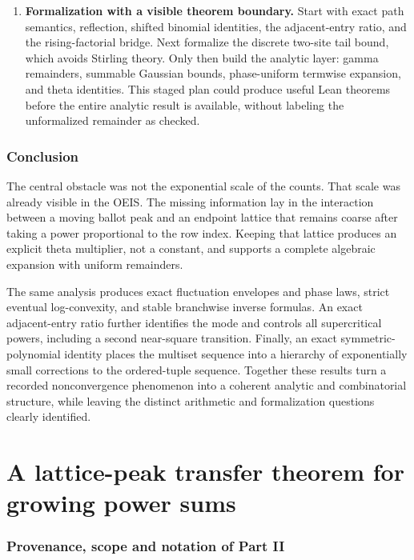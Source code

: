 \documentclass[11pt,a4paper]{article}
\numberwithin{equation}{section}
\theoremstyle{definition}
\begin{document}
\begin{enumerate}[leftmargin=*,label=\textbf{Q\arabic*.}]
\item \textbf{Formalization with a visible theorem boundary.}
Start with exact path semantics, reflection, shifted binomial identities,
the adjacent-entry ratio, and the rising-factorial bridge. Next formalize
the discrete two-site tail bound, which avoids Stirling theory. Only then
build the analytic layer: gamma remainders, summable Gaussian bounds,
phase-uniform termwise expansion, and theta identities. This staged plan
could produce useful Lean theorems before the entire analytic result is
available, without labeling the unformalized remainder as checked.
\end{enumerate}

\section{Conclusion}
The central obstacle was not the exponential scale of the counts. That
scale was already visible in the OEIS. The missing information lay in
the interaction between a moving ballot peak and an endpoint lattice
that remains coarse after taking a power proportional to the row index.
Keeping that lattice produces an explicit theta multiplier, not a
constant, and supports a complete algebraic expansion with uniform
remainders.

The same analysis produces exact fluctuation envelopes and phase laws,
strict eventual log-convexity, and stable branchwise inverse formulas.
An exact adjacent-entry ratio further identifies the mode and controls
all supercritical powers, including a second near-square transition.
Finally, an exact symmetric-polynomial identity places the multiset
sequence into a hierarchy of exponentially small corrections to the
ordered-tuple sequence. Together these results turn a recorded
nonconvergence phenomenon into a coherent analytic and combinatorial
structure, while leaving the distinct arithmetic and formalization
questions clearly identified.

\part{A lattice-peak transfer theorem for growing power sums}
\label{tbs:lpt:part}

\section{Provenance, scope and notation of Part II}\label{tbs:lpt:sec:front}
\end{document}
